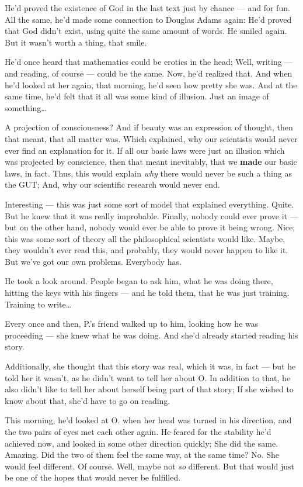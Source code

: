 He'd proved the existence of God in the last text just by chance --- and for fun. 
All the same, he'd made some connection to Douglas Adams again: He'd proved that God didn't exist, using quite the same amount of words. 
He smiled again. 
But it wasn't worth a thing, that smile.

He'd once heard that mathematics could be erotics in the head; Well, writing --- and reading, of course --- could be the same. 
Now, he'd realized that. And when he'd looked at her again, that morning, he'd seen how pretty she was. And at the same time, he'd felt that it all was some kind of illusion. 
Just an image of something\dots{}

A projection of consciousness?
And if beauty was an expression of thought, then that meant, that all matter was. 
Which explained, why our scientists would never ever find an explanation for it. 
If all our basic laws were just an illusion which was projected by conscience, then that meant inevitably, that we \textbf{made} our basic laws, in fact. Thus, this would explain \emph{why} there would never be such a thing as the GUT; And, why our scientific research would never end.

Interesting --- this was just some sort of model that explained everything. Quite. 
But he knew that it was really improbable. 
Finally, nobody could ever prove it --- but on the other hand, nobody would ever be able to prove it being wrong. 
Nice; this was some sort of theory all the philosophical scientists would like. 
Maybe, they wouldn't ever read this, and probably, they would never happen to like it. 
But we've got our own problems. Everybody has.

He took a look around. People began to ask him, what he was doing there, hitting the keys with his fingers --- and he told them, that he was just training. 
Training to write\dots{}

Every once and then, P.'s friend walked up to him, looking how he was proceeding --- she knew what he was doing. 
And she'd already started reading his story.

Additionally, she thought that this story was real, which it was, in fact --- but he told her it wasn't, as he didn't want to tell her about O. In addition to that, he also didn't like to tell her about herself being part of that story; If she wished to know about that, she'd have to go on reading.

This morning, he'd looked at O. when her head was turned in his direction, and the two pairs of eyes met each other again. 
He feared for the stability he'd achieved now, and looked in some other direction quickly; She did the same. 
Amazing. 
Did the two of them feel the same way, at the same time?
No. 
She would feel different. 
Of course. 
Well, maybe not \emph{so} different. 
But that would just be one of the hopes that would never be fulfilled.


